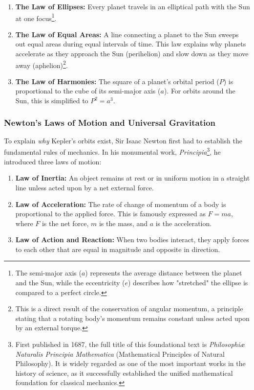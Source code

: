 \documentclass[10pt,a4paper]{article}
\begin{document}
\begin{enumerate}
    \item \textbf{The Law of Ellipses:} Every planet travels in an elliptical path with the Sun at one focus\footnote{The semi-major axis ($a$) represents the average distance between the planet and the Sun, while the eccentricity ($e$) describes how "stretched" the ellipse is compared to a perfect circle.}.
    \item \textbf{The Law of Equal Areas:} A line connecting a planet to the Sun sweeps out equal areas during equal intervals of time. This law explains why planets accelerate as they approach the Sun (perihelion) and slow down as they move away (aphelion)\footnote{This is a direct result of the conservation of angular momentum, a principle stating that a rotating body's momentum remains constant unless acted upon by an external torque.}.
    \item \textbf{The Law of Harmonies:} The square of a planet's orbital period ($P$) is proportional to the cube of its semi-major axis ($a$). For orbits around the Sun, this is simplified to $P^2 = a^3$.
\end{enumerate}

\subsubsection{Newton's Laws of Motion and Universal Gravitation}
To explain \textit{why} Kepler's orbits exist, Sir Isaac Newton first had to establish the fundamental rules of mechanics. In his monumental work, \textit{Principia}\footnote{First published in 1687, the full title of this foundational text is \textit{Philosophiæ Naturalis Principia Mathematica} (Mathematical Principles of Natural Philosophy). It is widely regarded as one of the most important works in the history of science, as it successfully established the unified mathematical foundation for classical mechanics.}, he introduced three laws of motion:

\begin{enumerate}
    \item \textbf{Law of Inertia:} An object remains at rest or in uniform motion in a straight line unless acted upon by a net external force.
    \item \textbf{Law of Acceleration:} The rate of change of momentum of a body is proportional to the applied force. This is famously expressed as $F = ma$, where $F$ is the net force, $m$ is the mass, and $a$ is the acceleration.
    \item \textbf{Law of Action and Reaction:} When two bodies interact, they apply forces to each other that are equal in magnitude and opposite in direction.
\end{enumerate}
\end{document}
